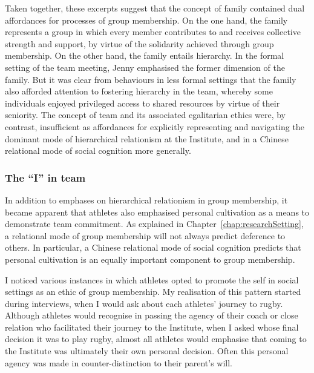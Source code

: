 \begin{CJK}{UTF8}{gbsn}
Taken together, these excerpts suggest that the concept of family  contained dual affordances for processes of group membership.  On the one hand, the family represents a group in which every member contributes to and receives collective strength and support, by virtue of the solidarity achieved through group membership.  On the other hand, the family entails hierarchy.  In the formal setting of the team meeting, Jenny emphasised the former dimension of the family.  But it was clear from behaviours in less formal settings that the family also afforded attention to fostering hierarchy in the team, whereby some individuals enjoyed privileged access to shared resources by virtue of their seniority.  The concept of team and its associated egalitarian ethics were, by contrast, insufficient as affordances for explicitly representing and navigating the dominant mode of hierarchical relationism at the Institute, and in a Chinese relational mode of social cognition more generally.




\subsubsection{The ``I'' in team \label{sect:IinTeam}}
In addition to emphases on hierarchical relationism in group membership, it became apparent that athletes also emphasised personal cultivation as a means to demonstrate team commitment.  As explained in Chapter~\ref{chap:researchSetting}, a relational mode of group membership will not always predict deference to others.  In particular, a Chinese relational mode of social cognition predicts that personal cultivation is an equally important component to group membership.

I noticed various instances in which athletes opted to promote the self in social settings as an ethic of group membership.  My realisation of this pattern started during interviews, when I would ask about each athletes' journey to rugby.  Although athletes would recognise in passing the agency of their coach or close relation who facilitated their journey to the Institute, when I asked whose final decision it was to play rugby, almost all athletes would emphasise that coming to the Institute was ultimately their own personal decision.  Often this personal agency was made in counter-distinction to their parent's will.


\end{CJK}
